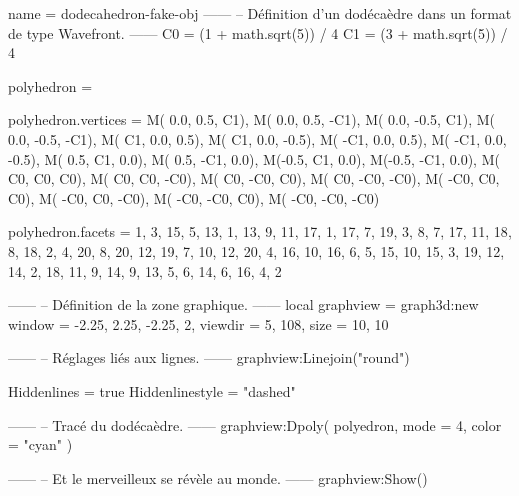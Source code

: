 \documentclass{standalone}
\begin{document}
\begin{luadraw}{name = dodecahedron-fake-obj}
------
-- Définition d'un dodécaèdre dans un format de type Wavefront.
------
C0 = (1 + math.sqrt(5)) / 4
C1 = (3 + math.sqrt(5)) / 4

polyhedron = {}

polyhedron.vertices = {
  M( 0.0,  0.5,   C1),
  M( 0.0,  0.5,  -C1),
  M( 0.0, -0.5,   C1),
  M( 0.0, -0.5,  -C1),
  M(  C1,  0.0,  0.5),
  M(  C1,  0.0, -0.5),
  M( -C1,  0.0,  0.5),
  M( -C1,  0.0, -0.5),
  M( 0.5,   C1,  0.0),
  M( 0.5,  -C1,  0.0),
  M(-0.5,   C1,  0.0),
  M(-0.5,  -C1,  0.0),
  M(  C0,   C0,   C0),
  M(  C0,   C0,  -C0),
  M(  C0,  -C0,   C0),
  M(  C0,  -C0,  -C0),
  M( -C0,   C0,   C0),
  M( -C0,   C0,  -C0),
  M( -C0,  -C0,   C0),
  M( -C0,  -C0,  -C0)
}

polyhedron.facets = {
  {  1,  3, 15,  5, 13},
  {  1, 13,  9, 11, 17},
  {  1, 17,  7, 19,  3},
  {  8,  7, 17, 11, 18},
  {  8, 18,  2,  4, 20},
  {  8, 20, 12, 19,  7},
  { 10, 12, 20,  4, 16},
  { 10, 16,  6,  5, 15},
  { 10, 15,  3, 19, 12},
  { 14,  2, 18, 11,  9},
  { 14,  9, 13,  5,  6},
  { 14,  6, 16,  4,  2}
}

------
-- Définition de la zone graphique.
------
local graphview = graph3d:new{
  window  = {-2.25, 2.25, -2.25, 2},
  viewdir = {5, 108},
  size    = {10, 10}
}

------
-- Réglages liés aux lignes.
------
graphview:Linejoin("round")

Hiddenlines     = true
Hiddenlinestyle = "dashed"

------
-- Tracé du dodécaèdre.
------
graphview:Dpoly(
  polyedron,
  {
    mode  = 4,
    color = "cyan"
  })

------
-- Et le merveilleux se révèle au monde.
------
graphview:Show()
\end{luadraw}
\end{document}
